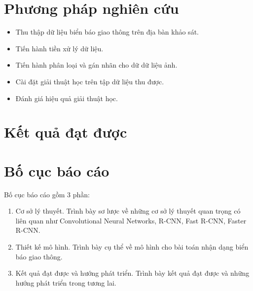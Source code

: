 \documentclass[../thesis.tex]{subfiles}
\begin{document}
\section{Phương pháp nghiên cứu}

\begin{itemize}
  \item Thu thập dữ liệu biển báo giao thông trên địa bàn khảo sát.
  \item Tiến hành tiền xử lý dữ liệu.
  \item Tiến hành phân loại và gán nhãn cho dữ dữ liệu ảnh.
  \item Cài đặt giải thuật học trên tập dữ liệu thu được.
  \item Đánh giá hiệu quả giải thuật học.
\end{itemize}

\section{Kết quả đạt được}


\section{Bố cục báo cáo}

Bố cục báo cáo gồm 3 phần:

\begin{enumerate}
  \item Cơ sở lý thuyết. Trình bày sơ lược về những cơ sở lý thuyết quan trọng có liên quan như Convolutional Neural Networks, R-CNN, Fast R-CNN, Faster R-CNN.
  \item Thiết kế mô hình. Trình bày cụ thể về mô hình cho bài toán nhận dạng biển báo giao thông.
  \item Kết quả đạt được và hướng phát triển. Trình bày kết quả đạt được và những hướng phát triển trong tương lai.
\end{enumerate}
\end{document}
